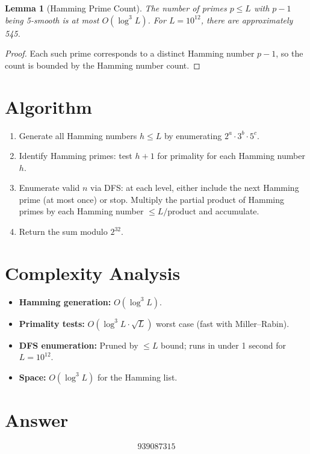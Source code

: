 \documentclass[11pt]{article}
\newtheorem{lemma}[theorem]{Lemma}
\begin{document}
\begin{lemma}[Hamming Prime Count]
The number of primes $p \leq L$ with $p - 1$ being 5-smooth is at most $O(\log^3 L)$. For $L = 10^{12}$, there are approximately 545.
\end{lemma}

\begin{proof}
Each such prime corresponds to a distinct Hamming number $p - 1$, so the count is bounded by the Hamming number count.
\end{proof}

\section{Algorithm}

\begin{enumerate}
    \item Generate all Hamming numbers $h \leq L$ by enumerating $2^a \cdot 3^b \cdot 5^c$.
    \item Identify Hamming primes: test $h + 1$ for primality for each Hamming number $h$.
    \item Enumerate valid $n$ via DFS: at each level, either include the next Hamming prime (at most once) or stop. Multiply the partial product of Hamming primes by each Hamming number $\leq L/\mathrm{product}$ and accumulate.
    \item Return the sum modulo $2^{32}$.
\end{enumerate}

\section{Complexity Analysis}

\begin{itemize}
    \item \textbf{Hamming generation:} $O(\log^3 L)$.
    \item \textbf{Primality tests:} $O(\log^3 L \cdot \sqrt{L})$ worst case (fast with Miller--Rabin).
    \item \textbf{DFS enumeration:} Pruned by $\leq L$ bound; runs in under 1 second for $L = 10^{12}$.
    \item \textbf{Space:} $O(\log^3 L)$ for the Hamming list.
\end{itemize}

\section{Answer}

\[
\boxed{939087315}
\]
\end{document}
